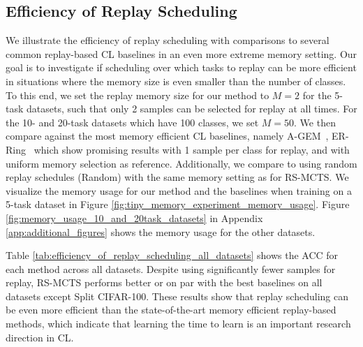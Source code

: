 




\subsection{Efficiency of Replay Scheduling}
\label{paperC:sec:efficiency_of_replay_scheduling}



We illustrate the efficiency of replay scheduling with comparisons to several common replay-based CL baselines in an even more extreme memory setting.
Our goal is to investigate if scheduling over which tasks to replay can be more efficient in situations where the memory size is even smaller than the number of classes. %
To this end, we set the replay memory size for our method
to $M=2$ for the 5-task datasets, such that only 2 samples can be selected for replay at all times. For the 10- and 20-task datasets which have 100 classes, we set $M=50$. We then compare against the most memory efficient CL baselines, namely A-GEM~, ER-Ring~ which show promising results with 1 sample per class for replay, %
and with uniform memory selection as reference. 
Additionally, we compare to using random replay schedules (Random) with the same memory setting as for RS-MCTS.
We visualize the memory usage for our method and the baselines when training on a 5-task dataset in Figure \ref{fig:tiny_memory_experiment_memory_usage}. 
Figure \ref{fig:memory_usage_10_and_20task_datasets} in Appendix \ref{app:additional_figures} shows the memory usage for the other datasets.

Table \ref{tab:efficiency_of_replay_scheduling_all_datasets} shows the ACC for each method across all datasets. Despite using significantly fewer samples for replay, RS-MCTS performs better or on par with the best baselines on all datasets except Split CIFAR-100. These results show that replay scheduling can be even more efficient than the state-of-the-art memory efficient replay-based methods, which indicate that learning the time to learn is an important research direction in CL.



